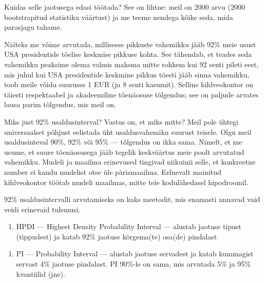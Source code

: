 \documentclass[]{book}
\newenvironment{Shaded}{\begin{snugshade}}{\end{snugshade}}
\newcommand{\CommentTok}[1]{\textcolor[rgb]{0.56,0.35,0.01}{\textit{#1}}}
\newcommand{\DataTypeTok}[1]{\textcolor[rgb]{0.13,0.29,0.53}{#1}}
\newcommand{\FloatTok}[1]{\textcolor[rgb]{0.00,0.00,0.81}{#1}}
\newcommand{\KeywordTok}[1]{\textcolor[rgb]{0.13,0.29,0.53}{\textbf{#1}}}
\newcommand{\NormalTok}[1]{#1}
\newcommand{\OperatorTok}[1]{\textcolor[rgb]{0.81,0.36,0.00}{\textbf{#1}}}
\providecommand{\tightlist}{%
  \setlength{\itemsep}{0pt}\setlength{\parskip}{0pt}}
\begin{document}
Kuidas selle jaotusega edasi töötada? See on lihtne: meil on 2000 arvu (2000 bootstrapitud statistiku väärtust) ja me teeme nendega kõike seda, mida parasjagu tahame.

Näiteks me võime arvutada, millisesse pikkuste vahemikku jääb 92\% meie usust USA presidentide tõelise keskmise pikkuse kohta. See tähendab, et teades seda vahemikku peaksime olema valmis maksma mitte rohkem kui 92 senti pileti eest, mis juhul kui USA presidentide keskmine pikkus tõesti jääb sinna vahemikku, toob meile võidu suuruses 1 EUR (ja 8 senti kasumit). Selline kihlveokontor on täiesti respektaabel ja akadeemiline tõenäosuse tõlgendus; see on paljude arvates lausa parim tõlgendus, mis meil on.

Miks just 92\% usaldusinterval? Vastus on, et miks mitte? Meil pole ühtegi universaalset põhjust eelistada üht usaldusvahemiku suurust teisele. Olgu meil usaldusinteval 90\%, 92\% või 95\% --- tõlgendus on ikka sama. Nimelt, et me usume, et suure tõenäosusega jääb tegelik keskväärtus meie poolt arvutatud vahemikku. Mudeli ja maailma erinevused tingivad niikuinii selle, et konkreetne number ei kandu mudelist otse üle pärismaailma. Eelnevalt mainitud kihlveokontor töötab mudeli maailmas, mitte teie kodulähedasel hipodroomil.

92\% usaldusintervalli arvutamiseks on kaks meetodit, mis enamasti annavad vaid veidi erinevaid tulemusi.

\begin{enumerate}
\def\labelenumi{\arabic{enumi}.}
\tightlist
\item
  HPDI --- Highest Density Probability Interval --- alustab jaotuse tipust (tippudest) ja katab 92\% jaotuse kõrgema(te) osa(de) pindalast
\end{enumerate}

\begin{Shaded}
\end{Shaded}

\begin{enumerate}
\def\labelenumi{\arabic{enumi}.}
\setcounter{enumi}{1}
\tightlist
\item
  PI --- Probability Interval --- alustab jaotuse servadest ja katab kummagist servast 4\% jaotuse pindalast. PI 90\%-le on sama, mis arvutada 5\% ja 95\% kvantiilid (jne).
\end{enumerate}
\end{document}
